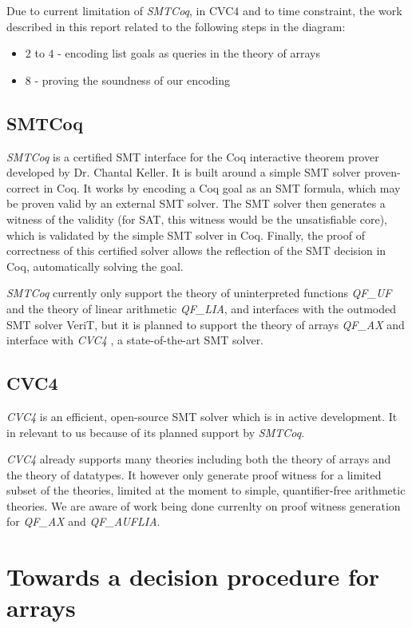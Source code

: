 \documentclass[onecolumn, preprint]{sigplanconf}
\begin{document}
Due to current limitation of \emph{SMTCoq}, in CVC4 and to time constraint, the work described in this report related to the following steps in the diagram:
\begin{itemize}
  \item $2$ to $4$ - encoding list goals as queries in the theory of arrays
  \item $8$ - proving the soundness of our encoding
\end{itemize}



\subsection{SMTCoq}
\emph{SMTCoq} is a certified SMT interface for the Coq interactive theorem prover developed by Dr. Chantal Keller. It is built around a simple SMT solver proven-correct in Coq.
It works by encoding a Coq goal as an SMT formula, which may be proven valid by an external SMT solver. The SMT solver then generates a witness of the validity (for SAT, this witness would be the unsatisfiable core), which is validated by the simple SMT solver in Coq. Finally, the proof of correctness of this certified solver allows the reflection of the SMT decision in Coq, automatically solving the goal.

\emph{SMTCoq} currently only support the theory of uninterpreted functions \emph{QF\_UF} and the theory of linear arithmetic \emph{QF\_LIA}, and interfaces with the outmoded SMT solver VeriT, but it is planned to support the theory of arrays \emph{QF\_AX} and interface with \emph{CVC4} \citep{CVC4}, a state-of-the-art SMT solver.

\subsection{CVC4}
\emph{CVC4} is an efficient, open-source SMT solver which is in active development. It in relevant to us because of its planned support by \emph{SMTCoq}.

\emph{CVC4} already supports many theories including both the theory of arrays and the theory of datatypes. It however only generate proof witness for a limited subset of the theories, limited at the moment to simple, quantifier-free arithmetic theories. We are aware of work being done currenlty on proof witness generation for \emph{QF\_AX} and \emph{QF\_AUFLIA}.


\section{Towards a decision procedure for arrays}
\label{sec:solution}
\end{document}
